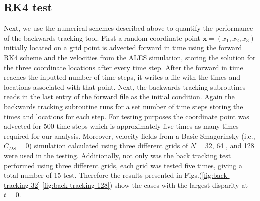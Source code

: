 \subsection{RK4 test} 
Next, we use the numerical schemes described above to
quantify the performance of the backwards tracking tool. First a random
coordinate point $\mathbf{x}=(x_{1}, x_{2}, x_{3})$ initially located on a
grid point is advected forward in time using the forward RK4 scheme and the
velocities from the ALES simulation, storing the solution for the three
coordinate locations after every time step. After the forward in time
reaches the inputted number of time steps, it writes a file with the times
and locations associated with that point. Next, the backwards tracking
subroutines reads in the last entry of the forward file as the initial
condition. Again the backwards tracking subroutine runs for a set number of
time steps storing the times and locations for each step. For testing
purposes the coordinate point was advected for 500 time steps which is
approximately five times as many times required for our analysis. Moreover,
velocity fields from a Basic Smagorinsky (i.e., $C_{DS} =0$) simulation
calculated using three different grids of $N=$32, 64 , and 128 were used in
the testing.  Additionally, not only was the back tracking test performed
using three different grids, each grid was tested five times, giving a
total number of 15 test. Therefore the results presented in
Figs.(\ref{fig:back-tracking-32}-\ref{fig:back-tracking-128}) show the
cases with the largest disparity at $t=0$.  

